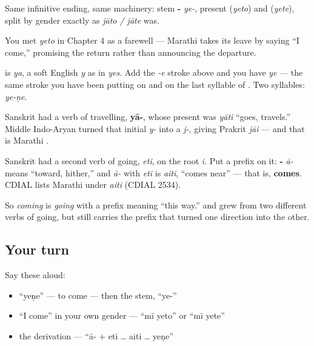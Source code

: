 Same infinitive ending, same machinery: stem \textbf{-} \emph{ye-}, present \textbf{} (\emph{yeto}) and \textbf{} (\emph{yete}), split by gender exactly as \emph{jāto / jāte} was.

You met \emph{yeto} in Chapter 4 as a farewell — Marathi takes its leave by saying \textquotedblleft{}I come,\textquotedblright{} promising the return rather than announcing the departure.

\begin{sounds}
\textbf{} is \emph{ya}, a soft English \emph{y} as in \emph{yes}. Add the \emph{-e} stroke above and you have \textbf{} \emph{ye} — the same stroke you have been putting on \textbf{} and on the last syllable of \textbf{}. Two syllables: \emph{ye-ṇe}.
\end{sounds}

\begin{cousinweb}
Sanskrit had a verb of travelling, \textbf{yā-}, whose present was \textbf{} \emph{yāti} \textquotedblleft{}goes, travels.\textquotedblright{} Middle Indo-Aryan turned that initial \emph{y-} into a \emph{j-}, giving Prakrit \emph{jāi} — and that is Marathi \textbf{}.

Sanskrit had a second verb of going, \emph{eti}, on the root \emph{i}. Put a prefix on it: \textbf{-} \emph{ā-} means \textquotedblleft{}toward, hither,\textquotedblright{} and \emph{ā-} with \emph{eti} is \emph{aiti}, \textquotedblleft{}comes near\textquotedblright{} — that is, \textbf{comes}. CDIAL lists Marathi \textbf{} under \emph{aiti} (CDIAL 2534).

So \emph{coming} is \emph{going} with a prefix meaning \textquotedblleft{}this way.\textquotedblright{} \textbf{} and \textbf{} grew from two different verbs of going, but \textbf{} still carries the prefix that turned one direction into the other.
\end{cousinweb}

\subsection*{Your turn}
Say these aloud:

\begin{itemize}
\raggedright
  \item \textquotedblleft{}yeṇe\textquotedblright{} — to come — then the stem, \textquotedblleft{}ye-\textquotedblright{}
  \item \textquotedblleft{}I come\textquotedblright{} in your own gender — \textquotedblleft{}mī yeto\textquotedblright{} or \textquotedblleft{}mī yete\textquotedblright{}
  \item the derivation — \textquotedblleft{}ā- + eti … aiti … yeṇe\textquotedblright{}
\end{itemize}

